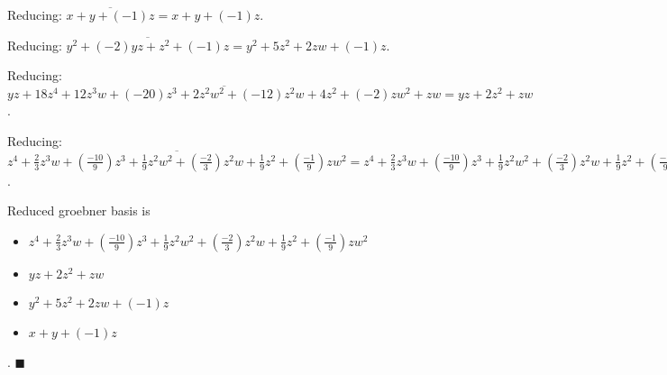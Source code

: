 Reducing: $\overline{x+y+(-1)z} = x+y+(-1)z$.

Reducing: $\overline{y^{2}+(-2)yz+z^{2}+(-1)z} = y^{2}+5z^{2}+2zw+(-1)z$.

Reducing: $\overline{yz+18z^{4}+12z^{3}w+(-20)z^{3}+2z^{2}w^{2}+(-12)z^{2}w+4z^{2}+(-2)zw^{2}+zw} = yz+2z^{2}+zw$.

Reducing: $\overline{z^{4}+\frac{2}{3}z^{3}w+(\frac{-10}{9})z^{3}+\frac{1}{9}z^{2}w^{2}+(\frac{-2}{3})z^{2}w+\frac{1}{9}z^{2}+(\frac{-1}{9})zw^{2}} = z^{4}+\frac{2}{3}z^{3}w+(\frac{-10}{9})z^{3}+\frac{1}{9}z^{2}w^{2}+(\frac{-2}{3})z^{2}w+\frac{1}{9}z^{2}+(\frac{-1}{9})zw^{2}$.

Reduced groebner basis is
\begin{itemize}
\item $z^{4}+\frac{2}{3}z^{3}w+(\frac{-10}{9})z^{3}+\frac{1}{9}z^{2}w^{2}+(\frac{-2}{3})z^{2}w+\frac{1}{9}z^{2}+(\frac{-1}{9})zw^{2}$
\item $yz+2z^{2}+zw$
\item $y^{2}+5z^{2}+2zw+(-1)z$
\item $x+y+(-1)z$
\end{itemize}  .
$\blacksquare{}$
